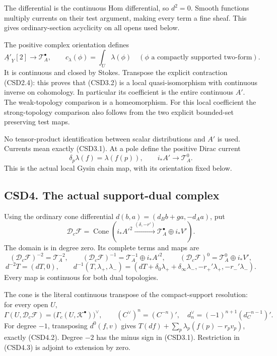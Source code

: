 The differential is the continuous Hom differential, so \(d^2=0\).
Smooth functions multiply currents on their test argument, making every
term a fine sheaf. This gives ordinary-section acyclicity on all opens
used below.

The positive complex orientation defines \[
\underline{A'}_Y[2]\longrightarrow\mathscr T_A^\bullet,\qquad
c_\lambda(\phi)=\int_U\lambda(\phi)
\quad(\phi\text{ a compactly supported two-form}).
\tag{CSD3.2}
\] It is continuous and closed by Stokes. Transpose the explicit
contraction (CSD2.4): this proves that (CSD3.2) is a local
quasi-isomorphism with continuous inverse on cohomology. In particular
its coefficient is the entire continuous \(A'\). The weak-topology
comparison is a homeomorphism. For this local coefficient the
strong-topology comparison also follows from the two explicit
bounded-set preserving test maps.

No tensor-product identification between scalar distributions and \(A'\)
is used. Currents mean exactly (CSD3.1). At a pole define the positive
Dirac current \[
\delta_p\lambda(f)=\lambda(f(p)),\qquad i_*A'\longrightarrow\mathscr T_A^0.
\tag{CSD3.3}
\] This is the actual local Gysin chain map, with its orientation fixed
below.

\subsection{CSD4. The actual support-dual
complex}\label{csd4.-the-actual-support-dual-complex}

Using the ordinary cone differential \(d(b,a)=(d_Bb+ga,-d_Aa)\), put \[
\boxed{\mathscr D_c\mathscr F
=\operatorname{Cone}\!\left(i_*A'^2
\xrightarrow{(\delta,-r')}
\mathscr T_A^\bullet\oplus i_*V'\right).}
\tag{CSD4.1}
\] The domain is in degree zero. Its complete terms and maps are \[
(\mathscr D_c\mathscr F)^{-2}=\mathscr T_A^{-2},\qquad
(\mathscr D_c\mathscr F)^{-1}=\mathscr T_A^{-1}\oplus i_*A'^2,\qquad
(\mathscr D_c\mathscr F)^0=\mathscr T_A^0\oplus i_*V',
\] \[
d^{-2}T=(dT,0),\qquad
d^{-1}(T,\lambda_+,\lambda_-)
=\left(dT+\delta_0\lambda_++\delta_\infty\lambda_-,
-r_+'\lambda_+,-r_-'\lambda_-\right).
\tag{CSD4.2}
\] Every map is continuous for both dual topologies.

The cone is the literal continuous transpose of the compact-support
resolution: for every open \(U\), \[
\boxed{\Gamma(U,\mathscr D_c\mathscr F)
=\bigl(\Gamma_c(U,\mathscr K^\bullet)\bigr)^\vee,\qquad
(C^\vee)^n=(C^{-n})',\quad
d^\vee_n=(-1)^{n+1}(d_C^{-n-1})'.}
\tag{CSD4.3}
\] For degree \(-1\), transposing \(d^0(f,v)\) gives
\(T(df)+\sum_p\lambda_p(f(p)-r_pv_p)\), exactly (CSD4.2). Degree \(-2\)
has the minus sign in (CSD3.1). Restriction in (CSD4.3) is adjoint to
extension by zero.

